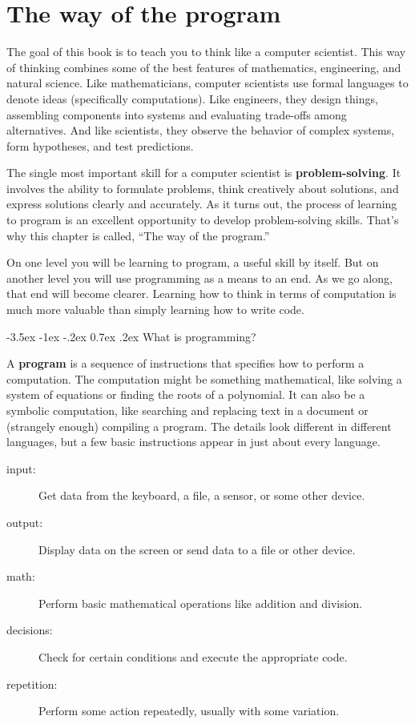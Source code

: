 \documentclass[12pt]{book}
\makeatletter
\theoremstyle{exercise}
\renewcommand{\section}{\@startsection {section}{1}{\z@}%
    {-3.5ex \@plus -1ex \@minus -.2ex}%
    {0.7ex \@plus.2ex}%
    {\normalfont\Large\bfseries}}
\makeatother
\begin{document}
\mainmatter


\chapter{The way of the program}

The goal of this book is to teach you to think like a computer scientist.
This way of thinking combines some of the best features of mathematics, engineering, and natural science.
Like mathematicians, computer scientists use formal languages to denote ideas (specifically computations).
Like engineers, they design things, assembling components into systems and evaluating trade-offs among alternatives.
And like scientists, they observe the behavior of complex systems, form hypotheses, and test predictions.

The single most important skill for a computer scientist is {\bf problem-solving}.
It involves the ability to formulate problems, think creatively about solutions, and express solutions clearly and accurately.
As it turns out, the process of learning to program is an excellent opportunity to develop problem-solving skills.
That's why this chapter is called, ``The way of the program.''

On one level you will be learning to program, a useful skill by itself.
But on another level you will use programming as a means to an end.
As we go along, that end will become clearer.
Learning how to think in terms of computation is much more valuable than simply learning how to write code.


\section{What is programming?}

A {\bf program} is a sequence of instructions that specifies how to perform a computation.
The computation might be something mathematical, like solving a system of equations or finding the roots of a polynomial.
It can also be a symbolic computation, like searching and replacing text in a document or (strangely enough) compiling a program.
The details look different in different languages, but a few basic instructions appear in just about every language.

\begin{description}
\item[input:] Get data from the keyboard, a file, a sensor, or some other device.
\item[output:] Display data on the screen or send data to a file or other device.
\item[math:] Perform basic mathematical operations like addition and division.
\item[decisions:] Check for certain conditions and execute the appropriate code.
\item[repetition:] Perform some action repeatedly, usually with some variation.
\end{description}
\end{document}
